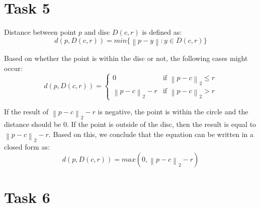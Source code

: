 \section{Task 5}

Distance between point $p$ and disc $D\left(c, r\right)$ is defined as:
\begin{equation}
    d\left(p,D\left(c,r\right)\right) = \textit{min}\{\left\|p-y\right\|: y \in D\left(c, r\right)\}
\end{equation}

Based on whether the point is within the disc or not, the following cases might occur:
\begin{equation}
	d\left( p,D(c,r) \right) = 
	\begin{cases} 
		0                           & \text{if } \left\|p - c\right\|_2 \leq r\\ 
		\left\|p - c\right\|_2 - r 	& \text{if } \left\|p - c\right\|_2 > r
	\end{cases}
\end{equation}

If the result of $\left\|p - c\right\|_2 - r$ is negative, the point is within the circle and the distance should be 0. If the point is outside of the disc, then the result is equal to $\left\|p - c\right\|_2 - r$. Based on this, we conclude that the equation can be written in a closed form as:
\begin{equation}
	d\left(p,D\left(c,r\right)\right) = \textit{max}\left(0, \left\|p - c\right\|_2 - r \right)
\end{equation}

\section{Task 6}

